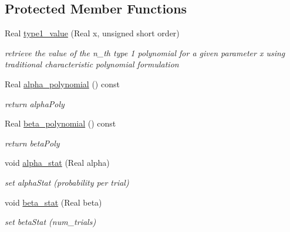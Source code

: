 \subsection*{Protected Member Functions}
\begin{DoxyCompactItemize}
\item 
Real \hyperlink{classPecos_1_1KrawtchoukOrthogPolynomial_a8792a858ac05a2158880e876f9da2019}{type1\+\_\+value} (Real x, unsigned short order)
\begin{DoxyCompactList}\small\item\em retrieve the value of the n\+\_\+th type 1 polynomial for a given parameter x using traditional characteristic polynomial formulation \end{DoxyCompactList}\item 
Real \hyperlink{classPecos_1_1KrawtchoukOrthogPolynomial_a997bdeddf670667c476513fcacc779ca}{alpha\+\_\+polynomial} () const \label{classPecos_1_1KrawtchoukOrthogPolynomial_a997bdeddf670667c476513fcacc779ca}

\begin{DoxyCompactList}\small\item\em return alpha\+Poly \end{DoxyCompactList}\item 
Real \hyperlink{classPecos_1_1KrawtchoukOrthogPolynomial_a22bfc4209dec76716ef51648e945469a}{beta\+\_\+polynomial} () const \label{classPecos_1_1KrawtchoukOrthogPolynomial_a22bfc4209dec76716ef51648e945469a}

\begin{DoxyCompactList}\small\item\em return beta\+Poly \end{DoxyCompactList}\item 
void \hyperlink{classPecos_1_1KrawtchoukOrthogPolynomial_aeeb4ce11a8d413209be1ec08eced8728}{alpha\+\_\+stat} (Real alpha)\label{classPecos_1_1KrawtchoukOrthogPolynomial_aeeb4ce11a8d413209be1ec08eced8728}

\begin{DoxyCompactList}\small\item\em set alpha\+Stat (probability per trial) \end{DoxyCompactList}\item 
void \hyperlink{classPecos_1_1KrawtchoukOrthogPolynomial_a7f9584e538ee1574bd4d8d1afb622ed6}{beta\+\_\+stat} (Real beta)\label{classPecos_1_1KrawtchoukOrthogPolynomial_a7f9584e538ee1574bd4d8d1afb622ed6}

\begin{DoxyCompactList}\small\item\em set beta\+Stat (num\+\_\+trials) \end{DoxyCompactList}\end{DoxyCompactItemize}

